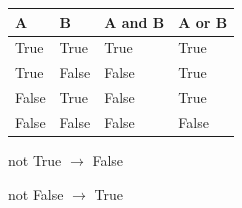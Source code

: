 
\begin{tabularx}
{\linewidth}
{
|>{\centering\arraybackslash}Y
|>{\centering\arraybackslash}Y
|>{\centering\arraybackslash}Y
|>{\centering\arraybackslash}Y|
}

\hline
{}

\textbf{A}
&
\textbf{B}
&
\textenglish{\ttfamily A and B}
&
\textenglish{\ttfamily A or B}
\\
\hline

True & True & True & True
\\
\hline

True & False & False & True
\\
\hline

False & True & False & True
\\
\hline

False & False & False & False
\\
\hline

\end{tabularx}

\begin{center}

\textenglish{\ttfamily not True}
\(\longrightarrow\)
\textenglish{\ttfamily False}

\qquad

\textenglish{\ttfamily not False}
\(\longrightarrow\)
\textenglish{\ttfamily True}

\end{center}



